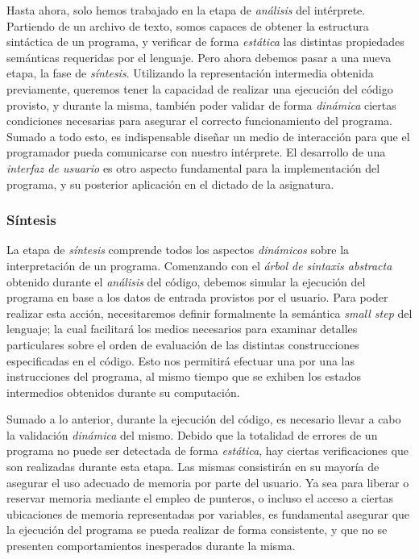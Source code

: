 Hasta ahora, solo hemos trabajado en la etapa de \textit{análisis} del intérprete.
Partiendo de un archivo de texto, somos capaces de obtener la estructura sintáctica de un programa, y verificar de forma \textit{estática} las distintas propiedades semánticas requeridas por el lenguaje.
Pero ahora debemos pasar a una nueva etapa, la fase de \textit{síntesis}.
Utilizando la representación intermedia obtenida previamente, queremos tener la capacidad de realizar una ejecución del código provisto, y durante la misma, también poder validar de forma \textit{dinámica} ciertas condiciones necesarias para asegurar el correcto funcionamiento del programa.
Sumado a todo esto, es indispensable diseñar un medio de interacción para que el programador pueda comunicarse con nuestro intérprete.
El desarrollo de una \textit{interfaz de usuario} es otro aspecto fundamental para la implementación del programa, y su posterior aplicación en el dictado de la asignatura.

\subsubsection{Síntesis}

La etapa de \textit{síntesis} comprende todos los aspectos \textit{dinámicos} sobre la interpretación de un programa.
Comenzando con el \textit{árbol de sintaxis abstracta} obtenido durante el \textit{análisis} del código, debemos simular la ejecución del programa en base a los datos de entrada provistos por el usuario.
Para poder realizar esta acción, necesitaremos definir formalmente la semántica \textit{small step} del lenguaje; la cual facilitará los medios necesarios para examinar detalles particulares sobre el orden de evaluación de las distintas construcciones especificadas en el código.
Esto nos permitirá efectuar una por una las instrucciones del programa, al mismo tiempo que se exhiben los estados intermedios obtenidos durante su computación.

Sumado a lo anterior, durante la ejecución del código, es necesario llevar a cabo la validación \textit{dinámica} del mismo.
Debido que la totalidad de errores de un programa no puede ser detectada de forma \textit{estática}, hay ciertas verificaciones que son realizadas durante esta etapa.
Las mismas consistirán en su mayoría de asegurar el uso adecuado de memoria por parte del usuario.
Ya sea para liberar o reservar memoria mediante el empleo de punteros, o incluso el acceso a ciertas ubicaciones de memoria representadas por variables, es fundamental asegurar que la ejecución del programa se pueda realizar de forma consistente, y que no se presenten comportamientos inesperados durante la misma.


